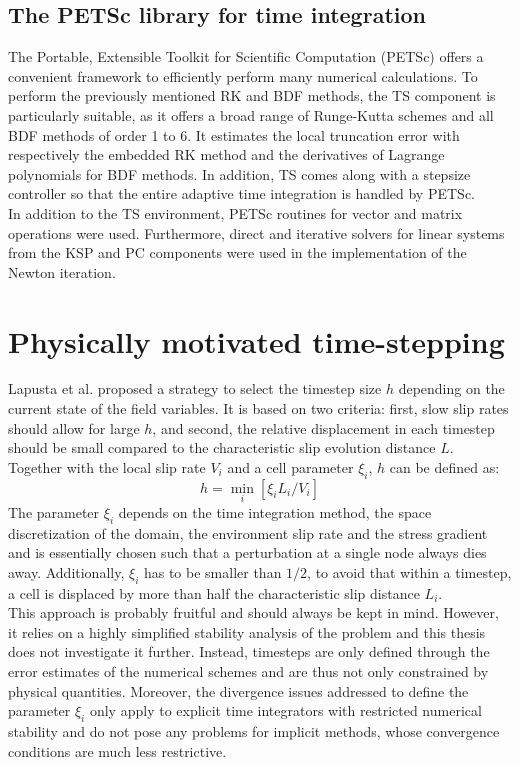 \subsection{The PETSc library for time integration}
The Portable, Extensible Toolkit for Scientific Computation (PETSc) \cite{PETSc} offers a convenient framework to efficiently perform many numerical calculations. To perform the previously mentioned RK and BDF methods, the TS component is particularly suitable, as it offers a broad range of Runge-Kutta schemes and all BDF methods of order 1 to 6. It estimates the local truncation error with respectively the embedded RK method and the derivatives of Lagrange polynomials for BDF methods. In addition, TS comes along with a stepsize controller so that the entire adaptive time integration is handled by PETSc. \\

In addition to the TS environment, PETSc routines for vector and matrix operations were used. Furthermore, direct and iterative solvers for linear systems from the KSP and PC components were used in the implementation of the Newton iteration.

\section{Physically motivated time-stepping}
\label{sec:Theory_PhysicalTimeStepping}

Lapusta et al. \cite{Lapusta} proposed a strategy to select the timestep size $h$ depending on the current state of the field variables. It is based on two criteria: first, slow slip rates should allow for large $h$, and second, the relative displacement in each timestep should be small compared to the characteristic slip evolution distance $L$. Together with the local slip rate $V_i$ and a cell parameter $\xi_i$, $h$ can be defined as:
\begin{equation}
	h = \min_i\left[\xi_i L_i / V_i \right]
\end{equation}
The parameter $\xi_i$ depends on the time integration method, the space discretization of the domain, the environment slip rate and the stress gradient and is essentially chosen such that a perturbation at a single node always dies away. Additionally, $\xi_i$ has to be smaller than $1/2$, to avoid that within a timestep, a cell is displaced by more than half the characteristic slip distance $L_i$. \\
This approach is probably fruitful and should always be kept in mind. However, it relies on a highly simplified stability analysis of the problem and this thesis does not investigate it further. Instead, timesteps are only defined through the error estimates of the numerical schemes and are thus not only constrained by physical quantities. Moreover, the divergence issues addressed to define the parameter $\xi_i$ only apply to explicit time integrators with restricted numerical stability and do not pose any problems for implicit methods, whose convergence conditions are much less restrictive.